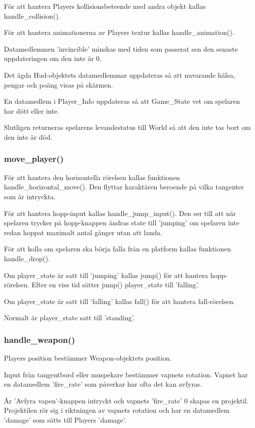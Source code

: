 \documentclass{TDP005mall}
\begin{document}
För att hantera Players kollisionsbeteende med andra objekt kallas handle\_collision().

För att hantera animationerna av Players textur kallas handle\_animation().

Datamedlemmen 'invincible' minskas med tiden som passerat sen den senaste uppdateringen om den inte är 0.

Det ägda Hud-objektets datamedlemmar uppdateras så att nuvarande hälsa, pengar och poäng visas på skärmen. 

En datamedlem i Player\_Info uppdateras så att Game\_State vet om spelaren har dött eller inte.

Slutligen returneras spelarens levandestatus till World så att den inte tas bort om den inte är död.

\subsubsection{move\_player()}
För att hantera den horisontella rörelsen kallas funktionen handle\_horizontal\_move().
Den flyttar karaktären beroende på vilka tangenter som är intryckta.

För att hantera hopp-input kallas handle\_jump\_input().
Den ser till att när spelaren trycker på hopp-knappen ändras state till 'jumping' om spelaren inte redan hoppat maximalt antal gånger utan att landa. 

För att kolla om spelaren ska börja falla från en platform kallas funktionen handle\_drop().

Om player\_state är satt till 'jumping' kallas jump() för att hantera hopp-rörelsen.
Efter en viss tid sätter jump() player\_state till 'falling'.

Om player\_state är satt till 'falling' kallas fall() för att hantera fall-rörelsen.

Normalt är player\_state satt till 'standing'. 


\subsubsection{handle\_weapon()}
Players position bestämmer Weapon-objektets position. 

Input från tangentbord eller muspekare bestämmer vapnets rotation.
Vapnet har en datamedlem 'fire\_rate' som påverkar hur ofta det kan avfyras. 

Är 'Avfyra vapen'-knappen intryckt och vapnets 'fire\_rate' 0 skapas en projektil.
Projektilen rör sig i riktningen av vapnets rotation och har en datamedlem 'damage' som sätts till Players 'damage'.
\end{document}
